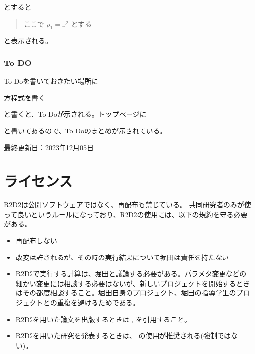 \documentclass[letterpaper,10pt,dvipdfmx,report]{sphinxmanual}
\begin{document}
\sphinxAtStartPar
とすると
\begin{quote}

\sphinxAtStartPar
ここで \(\rho_1=x^2\) とする
\end{quote}

\sphinxAtStartPar
と表示される。


\subsection{To DO}
\label{\detokenize{sphinx:to-do}}
\sphinxAtStartPar
To Doを書いておきたい場所に

\begin{sphinxVerbatim}[commandchars=\\\{\}]
  方程式を書く
\end{sphinxVerbatim}

\sphinxAtStartPar
と書くと、To Doが示される。トップページに

\begin{sphinxVerbatim}[commandchars=\\\{\}]
\end{sphinxVerbatim}

\sphinxAtStartPar
と書いてあるので、To Doのまとめが示されている。

\sphinxAtStartPar
最終更新日：2023年12月05日


\chapter{ライセンス}
\label{\detokenize{index:id1}}
\sphinxAtStartPar
R2D2は公開ソフトウェアではなく、再配布も禁じている。
共同研究者のみが使って良いというルールになっており、R2D2の使用には、以下の規約を守る必要がある。
\begin{itemize}
\item {} 
\sphinxAtStartPar
再配布しない

\item {} 
\sphinxAtStartPar
改変は許されるが、その時の実行結果について堀田は責任を持たない

\item {} 
\sphinxAtStartPar
R2D2で実行する計算は、堀田と議論する必要がある。パラメタ変更などの細かい変更には相談する必要はないが、新しいプロジェクトを開始するときはその都度相談すること。堀田自身のプロジェクト、堀田の指導学生のプロジェクトとの重複を避けるためである。

\item {} 
\sphinxAtStartPar
R2D2を用いた論文を出版するときは ,  を引用すること。

\item {} 
\sphinxAtStartPar
R2D2を用いた研究を発表するときは、 の使用が推奨される(強制ではない)。

\end{itemize}
\end{document}
